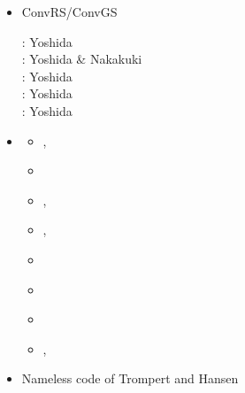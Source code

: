 \begin{itemize}
\item {\codefont ConvRS/ConvGS} 

\begin{scriptsize}
\noindent
\twothousandeight: Yoshida \cite{yosh08}\\
\twothousandnine: Yoshida \& Nakakuki \cite{yona09}\\
\twothousandtwelve: Yoshida \etal \cite{yoth12}\\
\twothousandthirteen: Yoshida \cite{yosh13} \\
\twothousandtwenty: Yoshida \etal \cite{yosy20}
\end{scriptsize} 

\item \douar {}

\begin{scriptsize}
\begin{itemize}
\item[\twothousandeight]     \textcite{brtf08}, \textcite{thfb08}
\item[\twothousandnine]      \textcite{yahb09}
\item[\twothousandten]       \textcite{brya10}, \textcite{lobh10}
\item[\twothousandfourteen]  \textcite{mutg14}, \textcite{whbb14}
\item[\twothousandeighteen]  \textcite{neew18}
\item[\twothousandnineteen]  \textcite{koen19}
\item[\twothousandtwenty]    \textcite{scwh20}
\item[\twothousandtwentytwo] \textcite{kone22}, \textcite{konf22}
\end{itemize}
\end{scriptsize} 

\item Nameless code of Trompert and Hansen

\begin{scriptsize}
\textcite{trha96}
\textcite{trha98}\textcite{trha98b}
\textcite{goch04}
\textcite{losh06}
\textcite{loha08}\textcite{stha08}
\textcite{stfh10}
\textcite{stlh13}
\textcite{stha13}
\textcite{stha14}
\end{scriptsize} 



\end{itemize}
